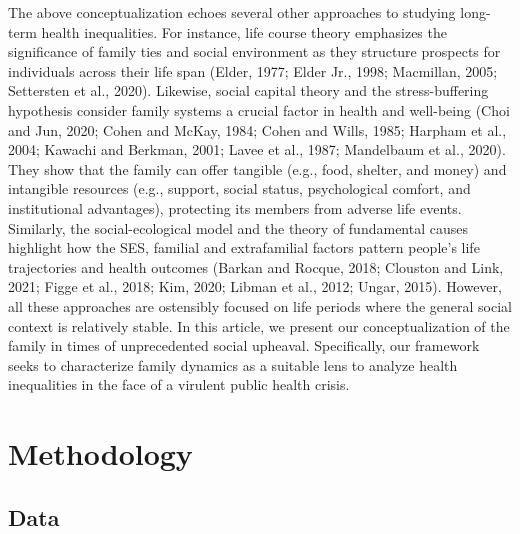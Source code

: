 \documentclass[
]{article}
\begin{document}
The above conceptualization echoes several other approaches to studying
long-term health inequalities. For instance, life course theory emphasizes the
significance of family ties and social environment as they structure prospects
for individuals across their life span (Elder, 1977; Elder Jr., 1998; Macmillan,
2005; Settersten et al., 2020). Likewise, social capital theory and the
stress-buffering hypothesis consider family systems a crucial factor in health
and well-being (Choi and Jun, 2020; Cohen and McKay, 1984; Cohen and Wills,
1985; Harpham et al., 2004; Kawachi and Berkman, 2001; Lavee et al., 1987;
Mandelbaum et al., 2020). They show that the family can offer tangible (e.g.,
food, shelter, and money) and intangible resources (e.g., support, social
status, psychological comfort, and institutional advantages), protecting its
members from adverse life events. Similarly, the social-ecological model and the
theory of fundamental causes highlight how the SES, familial and extrafamilial
factors pattern people's life trajectories and health outcomes (Barkan and
Rocque, 2018; Clouston and Link, 2021; Figge et al., 2018; Kim, 2020; Libman et
al., 2012; Ungar, 2015). However, all these approaches are ostensibly focused on
life periods where the general social context is relatively stable. In this
article, we present our conceptualization of the family in times of
unprecedented social upheaval. Specifically, our framework seeks to characterize
family dynamics as a suitable lens to analyze health inequalities in the face of
a virulent public health crisis.

\newpage

\hypertarget{methodology}{%
\section{Methodology}\label{methodology}}

\hypertarget{data}{%
\subsection{Data}\label{data}}
\end{document}
